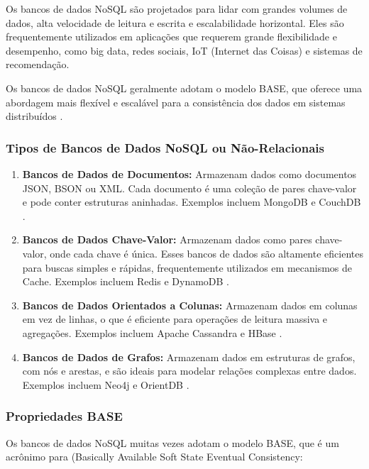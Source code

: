 Os bancos de dados NoSQL são projetados para lidar com grandes volumes de dados, alta velocidade de leitura e escrita e escalabilidade horizontal. Eles são frequentemente utilizados em aplicações que requerem grande flexibilidade e desempenho, como big data, redes sociais, IoT (Internet das Coisas) e sistemas de recomendação.

Os bancos de dados NoSQL geralmente adotam o modelo BASE, que oferece uma abordagem mais flexível e escalável para a consistência dos dados em sistemas distribuídos \cite{brewer2000}.

\subsubsection{Tipos de Bancos de Dados NoSQL ou Não-Relacionais}

\begin{enumerate}
    \item \textbf{Bancos de Dados de Documentos:} Armazenam dados como documentos JSON, BSON ou XML. Cada documento é uma coleção de pares chave-valor e pode conter estruturas aninhadas. Exemplos incluem MongoDB e CouchDB \cite{chodorow2013}.
    \item \textbf{Bancos de Dados Chave-Valor:} Armazenam dados como pares chave-valor, onde cada chave é única. Esses bancos de dados são altamente eficientes para buscas simples e rápidas, frequentemente utilizados em mecanismos de Cache. Exemplos incluem Redis e DynamoDB \cite{decandia2007}.
    \item \textbf{Bancos de Dados Orientados a Colunas:} Armazenam dados em colunas em vez de linhas, o que é eficiente para operações de leitura massiva e agregações. Exemplos incluem Apache Cassandra e HBase \cite{lakshman2010}.
    \item \textbf{Bancos de Dados de Grafos:} Armazenam dados em estruturas de grafos, com nós e arestas, e são ideais para modelar relações complexas entre dados. Exemplos incluem Neo4j e OrientDB \cite{angles2008}.
\end{enumerate}

\subsubsection{Propriedades BASE}

Os bancos de dados NoSQL muitas vezes adotam o modelo BASE, que é um acrônimo para (Basically Available Soft State Eventual Consistency:

